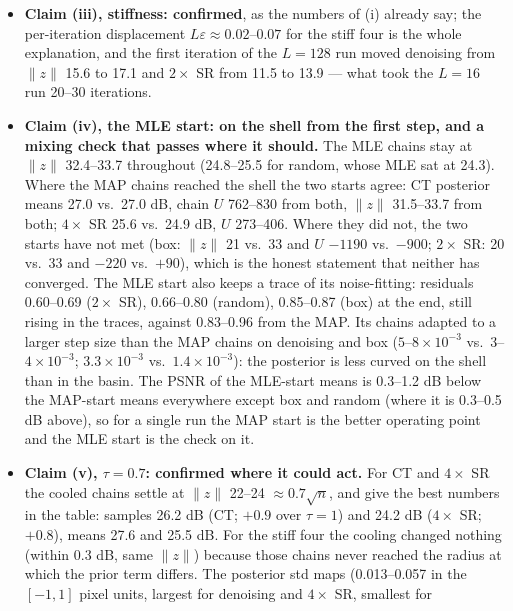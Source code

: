 \documentclass[11pt]{article}
\begin{document}
\begin{itemize}
  \item \textbf{Claim (iii), stiffness: confirmed}, as the numbers of (i)
        already say; the per-iteration displacement $L\varepsilon \approx
        0.02$--$0.07$ for the stiff four is the whole explanation, and
        the first iteration of the $L = 128$ run moved denoising from
        $\|z\|$ 15.6 to 17.1 and $2\times$ SR from 11.5 to 13.9 --- what
        took the $L = 16$ run 20--30 iterations.
  \item \textbf{Claim (iv), the MLE start: on the shell from the first
        step, and a mixing check that passes where it should.} The MLE
        chains stay at $\|z\|$ 32.4--33.7 throughout (24.8--25.5 for
        random, whose MLE sat at 24.3). Where the MAP chains reached the
        shell the two starts agree: CT posterior means 27.0 vs.\ 27.0 dB,
        chain $U$ 762--830 from both, $\|z\|$ 31.5--33.7 from both;
        $4\times$ SR 25.6 vs.\ 24.9 dB, $U$ 273--406. Where they did not,
        the two starts have not met (box: $\|z\|$ 21 vs.\ 33 and $U$
        $-1190$ vs.\ $-900$; $2\times$ SR: 20 vs.\ 33 and $-220$ vs.\
        $+90$), which is the honest statement that neither has converged.
        The MLE start also keeps a trace of its noise-fitting: residuals
        0.60--0.69 ($2\times$ SR), 0.66--0.80 (random), 0.85--0.87 (box)
        at the end, still rising in the traces, against 0.83--0.96 from
        the MAP. Its chains adapted to a larger step size than the MAP
        chains on denoising and box ($5$--$8 \times 10^{-3}$ vs.\ $3$--$4
        \times 10^{-3}$; $3.3 \times 10^{-3}$ vs.\ $1.4 \times 10^{-3}$):
        the posterior is less curved on the shell than in the basin. The
        PSNR of the MLE-start means is 0.3--1.2 dB below the MAP-start
        means everywhere except box and random (where it is 0.3--0.5 dB
        above), so for a single run the MAP start is the better operating
        point and the MLE start is the check on it.
  \item \textbf{Claim (v), $\tau = 0.7$: confirmed where it could act.}
        For CT and $4\times$ SR the cooled chains settle at $\|z\|$
        22--24 $\approx 0.7\sqrt n$, and give the best numbers in the
        table: samples 26.2 dB (CT; $+0.9$ over $\tau = 1$) and 24.2 dB
        ($4\times$ SR; $+0.8$), means 27.6 and 25.5 dB. For the stiff four
        the cooling changed nothing (within 0.3 dB, same $\|z\|$) because
        those chains never reached the radius at which the prior term
        differs. The posterior std maps (0.013--0.057 in the $[-1, 1]$
        pixel units, largest for denoising and $4\times$ SR, smallest for

\end{itemize}
\end{document}
